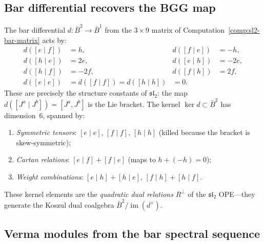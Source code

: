 \subsection{Bar differential recovers the BGG map}

\begin{computation}
\label{comp:bgg-differential}

The bar differential $d: \bar{B}^2 \to \bar{B}^1$ from the $3 \times 9$
matrix of Computation~\ref{comp:sl2-bar-matrix} acts by:
\begin{align}
d([e \mid f]) &= h, &
d([f \mid e]) &= -h, \label{eq:bgg-diff-bracket}\\
d([h \mid e]) &= 2e, &
d([e \mid h]) &= -2e, \\
d([h \mid f]) &= -2f, &
d([f \mid h]) &= 2f, \\
d([e \mid e]) &= d([f \mid f]) = d([h \mid h]) &= 0. \label{eq:bgg-diff-zero}
\end{align}
These are precisely the structure constants of $\mathfrak{sl}_2$:
the map $d([J^a \mid J^b]) = [J^a, J^b]$ is the Lie bracket.
The kernel $\ker d \subset \bar{B}^2$ has dimension~$6$, spanned by:
\begin{enumerate}[label=\textup{(\alph*)}]
\item \emph{Symmetric tensors}: $[e \mid e]$, $[f \mid f]$, $[h \mid h]$
  (killed because the bracket is skew-symmetric);
\item \emph{Cartan relations}: $[e \mid f] + [f \mid e]$
  (maps to $h + (-h) = 0$);
\item \emph{Weight combinations}: $[e \mid h] + [h \mid e]$,
  $[f \mid h] + [h \mid f]$.
\end{enumerate}
These kernel elements are the \emph{quadratic dual relations}
$R^\perp$ of the $\mathfrak{sl}_2$ OPE---they generate the Koszul dual
coalgebra $\bar{B}^2 / \operatorname{im}(d^\vee)$.
\end{computation}

\subsection{Verma modules from the bar spectral sequence}

